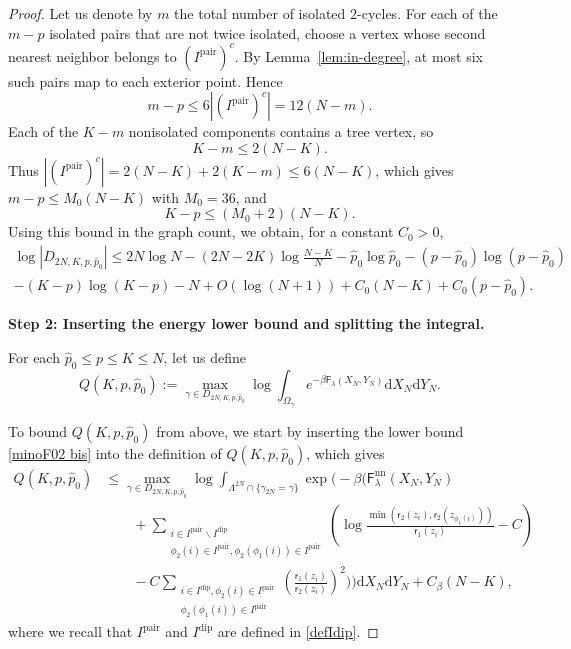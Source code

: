 \documentclass[a4paper,10pt,leqno]{amsart}
\numberwithin{equation}{section}
\newcommand{\dd}{\mathrm{d}}
\def\F{\mathsf{F}}
\def\rr{\mathsf{r}}
\newcommand{\dip}{\mathrm{dip}}
\def\pair{\mathrm{pair}}
\def\nn{\mathrm{nn}}
\begin{document}
\begin{proof}
  Let us denote by $m$ the total number of isolated $2$-cycles. For each of the $m-p$ isolated pairs that are not twice isolated, choose a vertex whose second nearest neighbor belongs to $(I^\pair)^c$. By Lemma~\ref{lem:in-degree}, at most six such pairs map to each exterior point. Hence
  \begin{equation*}
    m-p\le6|(I^\pair)^c|=12(N-m).
  \end{equation*}
  Each of the $K-m$ nonisolated components contains a tree vertex, so
  \begin{equation*}
    K-m\le2(N-K).
  \end{equation*}
  Thus $|(I^\pair)^c|=2(N-K)+2(K-m)\le6(N-K)$, which gives $m-p\le M_0(N-K)$ with $M_0=36$, and
  \begin{equation}\label{eq:K-p}
    K-p\le(M_0+2)(N-K).
  \end{equation}
  Using this bound in the graph count, we obtain, for a constant $C_0>0$,
  \begin{multline}\label{eq:logD}
    \log |D_{2N,K,p,\widehat p_0}|\leq 2N\log N- (2N-2K)\log \frac{N-K}{N} -\widehat p_0\log \widehat p_0-(p-\widehat p_0)\log (p-\widehat p_0)\\ -(K-p)\log(K-p)-N+O(\log(N+1))+C_0(N-K)+C_0(p-\widehat p_0).
  \end{multline}

  \noindent
  \textbf{Step 2: Inserting the energy lower bound and splitting the integral.}

  For each $\widehat p_0\leq p\leq K\leq N$, let us define
  \begin{equation*}
    Q(K,p,\widehat p_0):=\max_{\gamma\in D_{2N,K,p,\widehat p_0}}\log \int_{\Omega_\gamma}e^{-\beta \F_\lambda(X_N,Y_N)}\dd X_N \dd Y_N.
  \end{equation*}

  To bound $Q(K,p,\widehat p_0)$ from above, we start by inserting the lower bound \eqref{minoF02 bis} into the definition of $Q(K,p,\widehat p_0)$, which gives
  \begin{equation}\label{gre1}
  \begin{aligned}
    Q(K,p,\widehat p_0)&\leq \max_{\gamma\in D_{2N,K,p,\widehat p_0}}\log \int_{\Lambda^{2N}\cap\{\gamma_{2N}=\gamma\}} \exp\Bigg(-\beta \Bigg(\F_\lambda^{\nn}(X_N, Y_N) \\
    &\qquad+\sum_{\substack{i\in I^{\pair}\backslash I^{\dip}\\ \phi_2(i) \in I^\pair, \phi_2(\phi_1(i)) \in I^\pair}}\left( \log
    \frac{\min(\rr_2(z_i), \rr_2(z_{\phi_1(i)}))}{\rr_1(z_i)}-C\right)\\
    &\qquad-C \sum_{\substack{i \in I^{\dip} ,\phi_2(i)\in I^\pair\\ \phi_2(\phi_1(i))\in I^\pair }}
    \left( \frac{\rr_1(z_i)}{\rr_2(z_i)}\right)^2\Bigg)\Bigg)\dd X_N\dd Y_N+C_\beta(N-K),
  \end{aligned}
  \end{equation}
  where we recall that $I^\pair$ and $ I^\dip$ are defined in \eqref{defIdip}.


\end{proof}
\end{document}

